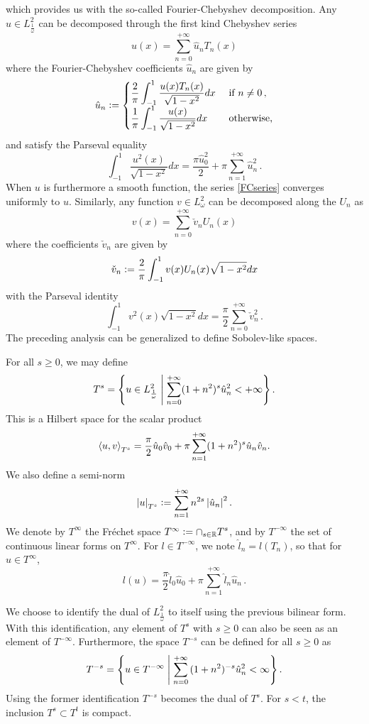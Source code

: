 \documentclass[a4paper]{article}
\begin{document}
which provides us with the so-called Fourier-Chebyshev decomposition. Any
$u\in L^2_{\frac{1}{\omega}}$ can be decomposed through the first kind Chebyshev series 
\begin{equation}
	u(x) = \sum_{n=0}^{+\infty} \hat{u}_n T_n(x)
	\label{FCseries}
\end{equation}
where the Fourier-Chebyshev coefficients $\hat{u}_n$ are given by 
\[ \hat{u}_n \mathrel{\mathop:}= \begin{cases}
\dfrac{2}{\pi}\displaystyle\int_{-1}^{1} \dfrac{u(x) T_n(x)}{\sqrt{1-x^2}}dx & \text{ if } n \neq 0\,,\\
\dfrac{1}{\pi}\displaystyle\int_{-1}^{1} \dfrac{u(x)}{\sqrt{1-x^2}}dx & \text{ otherwise,}\\
\end{cases}\]
and satisfy the Parseval equality
\[ \int_{-1}^{1} \frac{u^2(x)}{\sqrt{1-x^2}} dx =  \frac{\pi \hat{u}_0^2}{2} + \pi\sum_{n=1}^{+\infty}\hat{u}_n^2\,.\]
When $u$ is furthermore a smooth function, the series \eqref{FCseries} converges uniformly to $u$. Similarly, any 
function $v\in L^2_{\omega}$ can be decomposed along the $U_n$ as
\[ v(x) = \sum_{n=0}^{+\infty} \check{v}_n U_n(x)\]
where the coefficients $\check{v}_n$ are given by 
\[ \check{v}_n \mathrel{\mathop:}= 
\dfrac{2}{\pi}\displaystyle\int_{-1}^{1} v(x) U_n(x)\sqrt{1-x^2}dx  \]
with the Parseval identity
\[ \int_{-1}^{1} v^2(x)\sqrt{1-x^2} dx =  \frac{\pi}{2} \sum_{n=0}^{+\infty}\check{v}_n^2\,.\]
The preceding analysis can be generalized to define Sobolev-like spaces. 
\begin{Def}
	For all $s \geq 0$, we may define 
	\[T^s = \left\{ u \in L^2_\frac{1}{\omega}\mathrel{}\middle|\mathrel{} \sum_{n=0}^{+\infty}(1+n^2)^s \hat{u}_n^2 < + \infty\right\}.\]
	This is a Hilbert space for the scalar product
	\[\left\langle u,v\right\rangle_{T^s} = \frac{\pi}{2}\hat{u}_0 \hat{v}_0 + \pi\sum_{n=1}^{+\infty}(1+n^2)^s\hat{u}_n \hat{v}_n.\]
	We also define a semi-norm 
	\[\left\lvert u \right\rvert_{T^s} \mathrel{\mathop:}= \sum_{n = 1}^{+ \infty}n^{2s} \left\lvert \hat{u}_n \right\rvert^2.\]
	We denote by $T^{\infty}$ the Fr\'echet space $T^{\infty} \mathrel{\mathop:}= \displaystyle\cap_{s \in \mathbb{R}} T^s$, and by $T^{-\infty}$ the set of continuous linear forms on $T^{\infty}$. For $l \in T^{-\infty}$, we note $\hat{l}_n = l(T_n)$, so that for $u \in T^{\infty}$, 
	\[l(u) = \frac{\pi}{2}\hat{l}_0 \hat{u}_0 + \pi \sum_{n=1}^{+\infty} \hat{l}_n \hat{u}_n\,.\] 
		
	We choose to identify the dual of $L^2_\frac{1}{\omega}$ to itself using the previous bilinear form.  With this identification, any element of $T^s$ with $s \geq 0$ can also be seen as an element of $T^{-\infty}$.  
	Furthermore, the space $T^{-s}$ can be defined for all $s \geq 0$ as
	\[T^{-s} = \left\{ u \in T^{-\infty}\mathrel{}\middle|\mathrel{} \sum_{n=0}^{+\infty}{(1 + n^2)^{-s} \hat{u}_n^2} < \infty\right\}.\]
	Using the former identification $T^{-s}$ becomes the dual of $T^s$. 
	For $s < t$, the inclusion $T^s \subset T^t$ is compact.
\end{Def}
\end{document}
